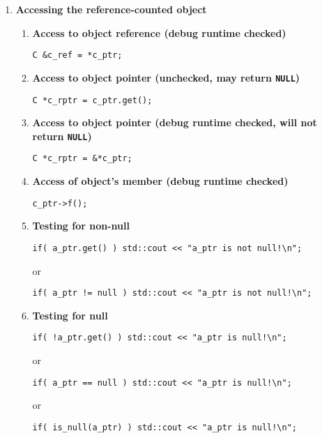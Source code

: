 \documentclass[pdf,ps2pdf,11pt]{SANDreport}
\begin{document}
\begin{enumerate}
\item {\bf Accessing the reference-counted object}
%
\begin{enumerate}
%
\item {\bf Access to object reference (debug runtime checked)}
%
{\small\begin{verbatim}
C &c_ref = *c_ptr;
\end{verbatim}}
%
\item {\bf Access to object pointer (unchecked, may return \texttt{NULL})}
%
{\small\begin{verbatim}
C *c_rptr = c_ptr.get();
\end{verbatim}}
%
\item {\bf Access to object pointer (debug runtime checked, will not return \texttt{NULL})}
%
{\small\begin{verbatim}
C *c_rptr = &*c_ptr;
\end{verbatim}}
%
\item {\bf Access of object's member (debug runtime checked)}
%
{\small\begin{verbatim}
c_ptr->f();
\end{verbatim}}
%
\item {\bf Testing for non-null}
%
{\small\begin{verbatim}
if( a_ptr.get() ) std::cout << "a_ptr is not null!\n";
\end{verbatim}}
%
or
%
{\small\begin{verbatim}
if( a_ptr != null ) std::cout << "a_ptr is not null!\n";
\end{verbatim}}
%
\item {\bf Testing for null}
%
{\small\begin{verbatim}
if( !a_ptr.get() ) std::cout << "a_ptr is null!\n";
\end{verbatim}}
%
or
%
{\small\begin{verbatim}
if( a_ptr == null ) std::cout << "a_ptr is null!\n";
\end{verbatim}}
%
or
%
{\small\begin{verbatim}
if( is_null(a_ptr) ) std::cout << "a_ptr is null!\n";
\end{verbatim}}

%
\end{enumerate}


\end{enumerate}
\end{document}
